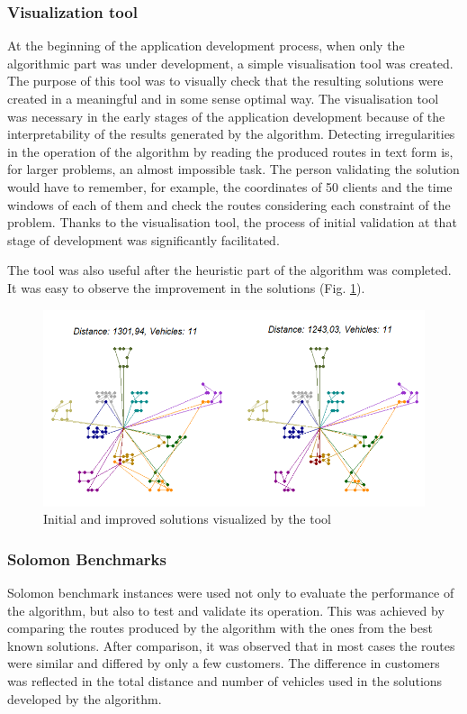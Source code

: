 \documentclass[a4paper,twoside,12pt]{book}
\begin{document}
\subsubsection{Visualization tool}
At the beginning of the application development process, when only the algorithmic part was under development, a simple visualisation tool was created. The purpose of this tool was to visually check that the resulting solutions were created in a meaningful and in some sense optimal way. The visualisation tool was necessary in the early stages of the application development because of the interpretability of the results generated by the algorithm. Detecting irregularities in the operation of the algorithm by reading the produced routes in text form is, for larger problems, an almost impossible task. The person validating the solution would have to remember, for example, the coordinates of 50 clients and the time windows of each of them and check the routes considering each constraint of the problem. Thanks to the visualisation tool, the process of initial validation at that stage of development was significantly facilitated.

The tool was also useful after the heuristic part of the algorithm was completed. It was easy to observe the improvement in the solutions (Fig. \ref{fig:visualizationTestExample}).

\begin{figure}[htb]
\centering
\includegraphics[width=\textwidth]{images/visualizationTestExample.png}
\caption{Initial and improved solutions visualized by the tool}
\label{fig:visualizationTestExample}
\end{figure}

\subsubsection{Solomon Benchmarks}
Solomon benchmark instances were used not only to evaluate the performance of the algorithm, but also to test and validate its operation. This was achieved by comparing the routes produced by the algorithm with the ones from the best known solutions. After comparison, it was observed that in most cases the routes were similar and differed by only a few customers. The difference in customers was reflected in the total distance and number of vehicles used in the solutions developed by the algorithm.
\end{document}
